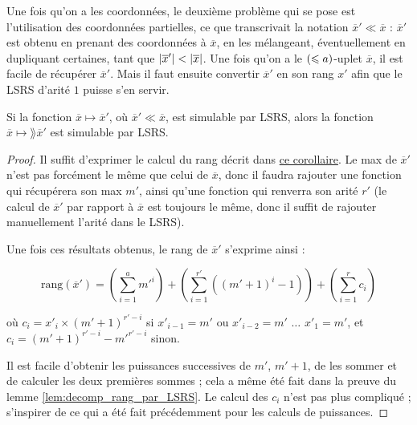 	Une fois qu'on a les coordonnées, le deuxième problème qui se pose est l'utilisation des coordonnées partielles, ce que transcrivait la notation $\overline{x}' \ll \overline{x}$ : $\overline{x}'$ est obtenu en prenant des coordonnées à $\overline{x}$, en les mélangeant, éventuellement en dupliquant certaines, tant que $\left|\overline{x}'\right| < \left|\overline{x}\right|$. Une fois qu'on a le $\left( \leqslant a \right)$-uplet $\overline{x}$, il est facile de récupérer $\overline{x}'$. Mais il faut ensuite convertir $\overline{x}'$ en son rang $x'$ afin que le LSRS d'arité $1$ puisse s'en servir. 
	
	\begin{lemma}
		\label{lem:sub_uplet_simulable}
		Si la fonction $\overline{x} \mapsto \overline{x}'$, où $\overline{x}' \ll \overline{x}$, est simulable par LSRS, alors la fonction $\overline{x} \mapsto \rang{\overline{x}'}$ est simulable par LSRS.
	\end{lemma}
	
	\begin{proof}
		Il suffit d'exprimer le calcul du rang décrit dans \hyperref[coro:rang_bon_ordre]{ce corollaire}. Le max de $\overline{x}'$ n'est pas forcément le même que celui de $\overline{x}$, donc il faudra rajouter une fonction qui récupérera son max $m'$, ainsi qu'une fonction qui renverra son arité $r'$ (le calcul de $\overline{x}'$ par rapport à $\overline{x}$ est toujours le même, donc il suffit de rajouter manuellement l'arité dans le LSRS). 
		
		Une fois ces résultats obtenus, le rang de $\overline{x}'$ s'exprime ainsi :
		
		\begin{equation}
			\text{rang}\left(\overline{x}'\right) = \left( \sum_{i=1}^{a} m'^i \right) + \left( \sum_{i=1}^{r'} \left( \left(m'+1\right)^i -1 \right) \right) + \left(\sum_{i=1}^{r} c_i \right)
		\end{equation}
		
		où $c_i = x'_i \times \left(m'+1\right)^{r'-i}$ si $x'_{i-1} = m'$ ou $x'_{i-2} = m'$ $\dots$ $x'_{1} = m'$, et $c_i = \left(m'+1\right)^{r'-i}-m'^{r'-i}$ sinon.
		
		Il est facile d'obtenir les puissances successives de $m'$, $m'+1$, de les sommer et de calculer les deux premières sommes ; cela a même été fait dans la preuve du lemme \ref{lem:decomp_rang_par_LSRS}. Le calcul des $c_i$ n'est pas plus compliqué ; s'inspirer de ce qui a été fait précédemment pour les calculs de puissances.
	\end{proof}
	
